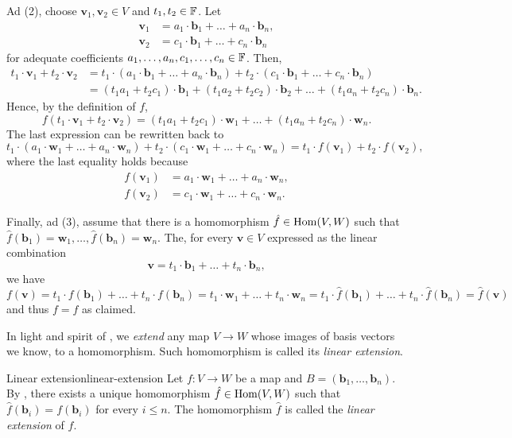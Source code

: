 \begin{thmproof}
 Ad (2), choose $\mathbf{v}_1,\mathbf{v}_2 \in V$ and $t_1,t_2 \in \mathbb{F}$. Let
 \begin{align*}
  \mathbf{v}_1 &= a_1 \cdot \mathbf{b}_1 + \ldots + a_n \cdot \mathbf{b}_n,\\
  \mathbf{v}_2 &= c_1 \cdot \mathbf{b}_1 + \ldots + c_n \cdot \mathbf{b}_n
 \end{align*}
 for adequate coefficients $a_1,\ldots,a_n,c_1,\ldots,c_n \in \mathbb{F}$. Then,
 \begin{align*}
  t_1 \cdot \mathbf{v}_1 + t_2 \cdot \mathbf{v}_2 
  &= t_1 \cdot (a_1 \cdot \mathbf{b}_1 + \ldots + a_n \cdot \mathbf{b}_n) + t_2
  \cdot (c_1 \cdot \mathbf{b}_1 + \ldots + c_n \cdot \mathbf{b}_n)\\
  &=(t_1a_1 + t_2c_1) \cdot \mathbf{b}_1 + (t_1a_2 + t_2c_2) \cdot \mathbf{b}_2
  + \ldots + (t_1a_n + t_2c_n) \cdot \mathbf{b}_n.
 \end{align*}
 Hence, by the definition of $f$,
 \[
  f(t_1 \cdot \mathbf{v}_1 + t_2 \cdot \mathbf{v}_2) = (t_1a_1 + t_2c_1) \cdot
  \mathbf{w}_1 + \ldots + (t_1a_n + t_2c_n) \cdot \mathbf{w}_n.
 \]
 The last expression can be rewritten back to
 \[
  t_1 \cdot (a_1 \cdot \mathbf{w}_1 + \ldots + a_n \cdot \mathbf{w}_n) + t_2
  \cdot (c_1 \cdot \mathbf{w}_1 + \ldots + c_n \cdot \mathbf{w}_n) = t_1 \cdot
  f(\mathbf{v}_1) + t_2 \cdot f(\mathbf{v}_2),
 \]
 where the last equality holds because
 \begin{align*}
  f(\mathbf{v}_1) &= a_1 \cdot \mathbf{w}_1 + \ldots + a_n \cdot \mathbf{w}_n,\\
  f(\mathbf{v}_2) &= c_1 \cdot \mathbf{w}_1 + \ldots + c_n \cdot \mathbf{w}_n.
 \end{align*}

 Finally, ad (3), assume that there is a homomorphism $\hat{f} \in \operatorname{Hom}(V,W)$
 such that $\hat{f}(\mathbf{b}_1) = \mathbf{w}_1, \ldots, \hat{f}(\mathbf{b}_n)
 = \mathbf{w}_n$. The, for every $\mathbf{v} \in V$ expressed as the linear
 combination
 \[
  \mathbf{v} = t_1 \cdot \mathbf{b}_1 + \ldots + t_n \cdot \mathbf{b}_n,
 \]
 we have
 \[
  f(\mathbf{v}) = t_1 \cdot f(\mathbf{b}_1) + \ldots + t_n \cdot f(\mathbf{b}_n)
  = t_1 \cdot \mathbf{w}_1 + \ldots + t_n \cdot \mathbf{w}_n = t_1 \cdot
  \hat{f}(\mathbf{b}_1) + \ldots + t_n \cdot \hat{f}(\mathbf{b}_n) =
  \hat{f}(\mathbf{v})
 \]
 and thus $f = \hat{f}$ as claimed.
\end{thmproof}

In light and spirit of , we \emph{extend} any
map $V \to W$ whose images of basis vectors we know, to a homomorphism. Such
homomorphism is called its \emph{linear extension}.

\begin{definition}{Linear extension}{linear-extension}
 Let $f:V \to W$ be a map and $B = (\mathbf{b}_1,\ldots,\mathbf{b}_n)$. By
 , there exists a unique homomorphism
 $\hat{f} \in \operatorname{Hom}(V,W)$ such that $\hat{f}(\mathbf{b}_i) = f(\mathbf{b}_i)$ for
 every $i \leq n$. The homomorphism $\hat{f}$ is called the \emph{linear
 extension} of $f$.
\end{definition}


